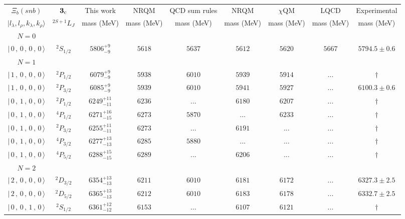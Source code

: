 \begin{tabular}{c c| c c c c c c c}\hline \hline
$\Xi_{b}(snb)$& ${\bf {3}}_{\rm c}$& This work   &   NRQM \cite{Yoshida2015}     &  QCD sum rules \cite{Liu2008, Mao2015, Chen2016}      &  NRQM \cite{Roberts2008}    & $\chi$QM \cite{Kim2021}        & LQCD \cite{Mohanta2020}     & Experimental  \\ 
 $\vert l_{\lambda}, l_{\rho}, k_{\lambda}, k_{\rho} \rangle$ & $^{2S+1}L_{J}$ & mass (MeV)  &   mass (MeV)  &  mass (MeV)  &  mass (MeV) & mass (MeV) & mass (MeV) &      mass (MeV) \\ \hline
\hline
 $N=0$  &  &  &  &  &  \\ 
$\vert \,0\,,\,0\,,\,0\,,\,0 \,\rangle $ & $^{2}S_{1/2}$ & $5806^{+9}_{-9}$ & $5618$ & $5637$ & $5612$ & $5620$ & $5667$ & $5794.5\pm 0.6$ \\ 
\hline
 $N=1$  &  &  &  &  &  \\ 
$\vert \,1\,,\,0\,,\,0\,,\,0 \,\rangle $ & $^{2}P_{1/2}$ & $6079^{+9}_{-9}$ & $5938$ & $6010$ & $5939$ & $5914$ & ... & $\dagger$ \\ 
$\vert \,1\,,\,0\,,\,0\,,\,0 \,\rangle $ & $^{2}P_{3/2}$ & $6085^{+9}_{-9}$ & $5939$ & $6010$ & $5941$ & $5927$ & ... & $6100.3\pm 0.6$ \\ 
$\vert \,0\,,\,1\,,\,0\,,\,0 \,\rangle $ & $^{2}P_{1/2}$ & $6249^{+11}_{-11}$ & $6236$ & ... & $6180$ & $6207$ & ... & $\dagger$ \\ 
$\vert \,0\,,\,1\,,\,0\,,\,0 \,\rangle $ & $^{4}P_{1/2}$ & $6271^{+16}_{-15}$ & $6273$ & $5870$ & ... & $6233$ & ... & $\dagger$ \\ 
$\vert \,0\,,\,1\,,\,0\,,\,0 \,\rangle $ & $^{2}P_{3/2}$ & $6255^{+11}_{-11}$ & $6273$ & ... & $6191$ & ... & ... & $\dagger$ \\ 
$\vert \,0\,,\,1\,,\,0\,,\,0 \,\rangle $ & $^{4}P_{3/2}$ & $6277^{+13}_{-13}$ & $6285$ & $5880$ & ... & ... & ... & $\dagger$ \\ 
$\vert \,0\,,\,1\,,\,0\,,\,0 \,\rangle $ & $^{4}P_{5/2}$ & $6288^{+15}_{-15}$ & $6289$ & ... & $6206$ & ... & ... & $\dagger$ \\ 
\hline
 $N=2$  &  &  &  &  &  \\ 
$\vert \,2\,,\,0\,,\,0\,,\,0 \,\rangle $ & $^{2}D_{3/2}$ & $6354^{+13}_{-13}$ & $6211$ & $6010$ & $6181$ & $6172$ & ... & $6327.3\pm 2.5$ \\ 
$\vert \,2\,,\,0\,,\,0\,,\,0 \,\rangle $ & $^{2}D_{5/2}$ & $6365^{+13}_{-13}$ & $6212$ & $6010$ & $6183$ & $6178$ & ... & $6332.7\pm 2.5$ \\ 
$\vert \,0\,,\,0\,,\,1\,,\,0 \,\rangle $ & $^{2}S_{1/2}$ & $6361^{+12}_{-12}$ & $6153$ & ... & $6107$ & $6121$ & ... & $\dagger$ \\ 

\end{tabular}
